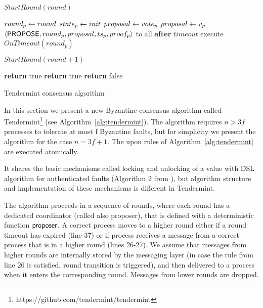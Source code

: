 \begin{algorithm}[htb!]
\begin{algorithmic}[1]
\SPACE
{} \label{line:tab:skipViews}
\STATE $StartRound(round)$
\ENDUPON


\SPACE
{} \label{line:tab:startRound}
 \STATE $round_p \leftarrow round$
 \STATE $state_p \leftarrow init$
     \STATE $proposal \leftarrow vote_p$
   \ELSE 
   	 \STATE $proposal \leftarrow v_p$
   \ENDIF	  	  
   \STATE \PBroadcast\ $\langle\mathsf{PROPOSE},round_p,proposal,ts_p, proof_p\rangle$ to all \label{line:tab:send-propose}
 \ENDIF
  \STATE \textbf{after} $timeout$ execute $OnTimeout(round_p)$
\ENDFUNCTION

\SPACE
{} \label{line:tab:onTimeoutStart}
   \STATE $StartRound(round+1)$ \label{line:tab:onTimeout}
  \ENDIF	
\ENDFUNCTION

\SPACE
{} \label{line:tab:isValidProposal}
  \STATE \textbf{return} true
\ENDIF
{} 
  \STATE \textbf{return} true
\ENDIF
\STATE \textbf{return} false
\ENDFUNCTION

\end{algorithmic}
\caption{Tendermint consensus algorithm}
\label{alg:tendermint}
\end{algorithm}


In this section we present a new Byzantine consensus algorithm called Tendermint\footnote{https://github.com/tendermint/tendermint} 
(see Algorithm~\ref{alg:tendermint}). 
The algorithm requires $n > 3f$ processes to tolerate at most f Byzantine faults, but for simplicity we present the algorithm for the case $n = 3f + 1$. The upon rules of Algorithm~\ref{alg:tendermint} are executed atomically. 

It shares the basic mechanisms called locking and unlocking of a value with DSL algorithm for authenticated faults (Algorithm 2 from \cite{DLS88:jacm}), but algorithm structure and implementation of these mechanisms is different in Tendermint. 

The algorithm proceeds in a sequence of rounds, where each round has a dedicated coordinator (called also proposer), that is defined with a deterministic function $\mathsf{proposer}$. A correct process moves to a higher round either if a round timeout has expired (line 37) or if process receives a message from a correct process that is in a higher round (lines 26-27). We assume that messages from higher rounds are internally stored by the messaging layer (in case the rule from line 26 is satisfied, round transition is triggered), and then delivered to a process when it enters the corresponding round. Messages from lower rounds are dropped.  

